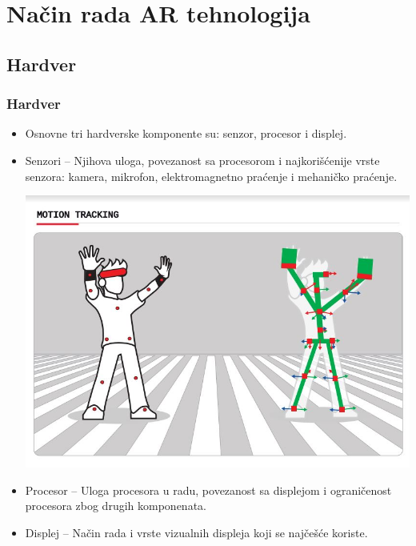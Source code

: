 \documentclass[9pt]{beamer}
\begin{document}
\section{Način rada AR tehnologija}
\subsection{Hardver}
	\begin{frame}
 \frametitle{Hardver}
        \begin{itemize}
            \setlength\itemsep{1.2em}
                \item Osnovne tri hardverske komponente su: senzor, procesor i displej.
                \item Senzori – Njihova uloga, povezanost sa procesorom i najkorišćenije vrste senzora: kamera, mikrofon, elektromagnetno praćenje i mehaničko 			praćenje.
		\begin{center}
		         	 \includegraphics[scale=0.23]{motion_tracking.jpg}
	           \end{center}
                \item Procesor – Uloga procesora u radu, povezanost sa displejom i ograničenost procesora zbog drugih komponenata.
                \item Displej – Način rada i vrste vizualnih displeja koji se najčešće koriste.
        \end{itemize}
            
	\end{frame}
\end{document}
